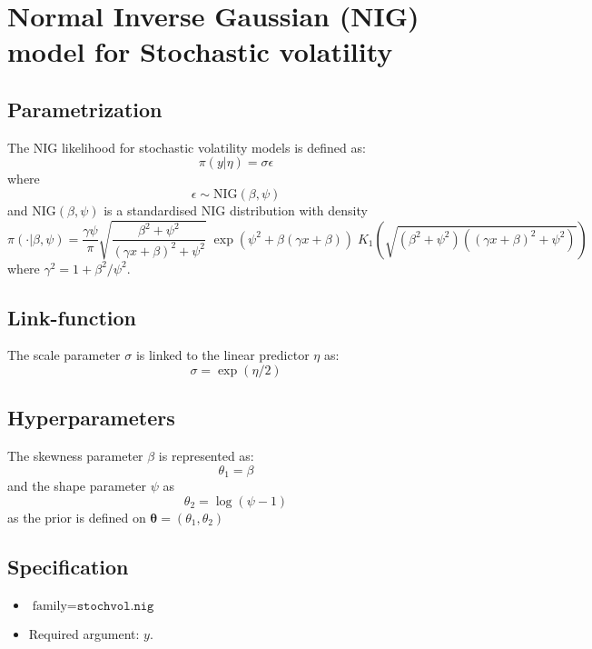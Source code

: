 \documentclass[a4paper,11pt]{article}
\begin{document}
\section*{ Normal Inverse Gaussian (NIG) model for Stochastic volatility}

\subsection*{Parametrization}

The NIG likelihood for stochastic volatility models is defined as:
\[
\pi(y |\eta )=\sigma \epsilon 
\]
where
\[
\epsilon \sim\mbox{NIG}(\beta,\psi)
\]
and $\mbox{NIG}(\beta,\psi)$ is a standardised NIG distribution with density
\begin{displaymath}
    \pi(\cdot|\beta,\psi)=\frac{\gamma\psi}{\pi} \sqrt{ \frac{\beta^{2} +
            \psi^{2}}{(\gamma x + \beta)^{2} + \psi^{2}}}
    \;
    \exp\left(\psi^{2} + \beta(\gamma x + \beta)\right)
    \;
    K_{1}\left(\sqrt{ \left(\beta^{2}+\psi^{2}\right)\left((\gamma x
            + \beta)^{2}+\psi^{2}\right)}\right)
\end{displaymath}
where $\gamma^{2} = 1 + \beta^{2}/\psi^{2}$.


\subsection*{Link-function}

The scale parameter $\sigma $ is linked to the linear predictor $\eta $ as:
\[
\sigma =\exp(\eta /2)
\]


\subsection*{Hyperparameters}

The skewness parameter $\beta$ is represented as:
\[
\theta_1 = \beta
\]
and the shape parameter $\psi$ as
\[
\theta_2 = \log(\psi-1)
\]
as the prior is defined on $\mathbf{\theta}=(\theta_1,\theta_2)$

\subsection*{Specification}

\begin{itemize}
\item $\text{family}=\texttt{stochvol.nig}$
\item Required argument: $y$.
\end{itemize}
\end{document}
